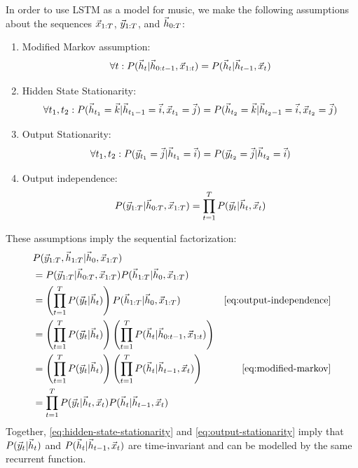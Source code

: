 In order to use LSTM as a model for music, we make the following assumptions
about the sequences $\vec{x}_{1:T}$, $\vec{y}_{1:T}$, and $\vec{h}_{0:T}$:
\begin{enumerate}
  \item Modified Markov assumption:
    \begin{equation}
      \label{eq:modified-markov}
      \forall t: P(\vec{h}_t | \vec{h}_{0:t-1}, \vec{x}_{1:t}) = P(\vec{h}_t | \vec{h}_{t-1}, \vec{x}_t)
    \end{equation}
  \item Hidden State Stationarity:
    \begin{equation}
      \label{eq:hidden-state-stationarity}
      \forall t_1, t_2: P(\vec{h}_{t_1} = \vec{k} | \vec{h}_{t_{1}-1} = \vec{i}, \vec{x}_{t_1} = \vec{j}) = P(\vec{h}_{t_2} = \vec{k} | \vec{h}_{t_{2}-1} = \vec{i}, \vec{x}_{t_2} = \vec{j})
   \end{equation}
  \item Output Stationarity:
    \begin{equation}
      \label{eq:output-stationarity}
      \forall t_1, t_2: P(\vec{y}_{t_1} = \vec{j} | \vec{h}_{t_1} = \vec{i}) = P(\vec{y}_{t_2} = \vec{j} | \vec{h}_{t_2} = \vec{i})
   \end{equation}
  \item Output independence:
   \begin{equation}
     \label{eq:output-independence}
     P(\vec{y}_{1:T} | \vec{h}_{0:T}, \vec{x}_{1:T}) = \prod_{t=1}^T P(\vec{y}_t | \vec{h}_{t}, \vec{x}_t)
   \end{equation}
\end{enumerate}

These assumptions imply the sequential factorization:
\begin{align}
  &P(\y_{1:T}, \h_{1:T} | \h_0, \x_{1:T})  &\\
  &= P(\y_{1:T} | \h_{0:T}, \x_{1:T}) P(\h_{1:T} | \h_0, \x_{1:T})  &\\
  &= \left( \prod_{t=1}^T P(\y_t | \h_t) \right) P(\h_{1:T}| \h_0, \x_{1:T}) &\text{\cref{eq:output-independence}}\\
  &= \left( \prod_{t=1}^T P(\y_t | \h_t) \right) \left(\prod_{t=1}^T P(\h_{t}| \h_{0:t-1}, \x_{1:t})\right) &\\
  &= \left( \prod_{t=1}^T P(\y_t | \h_t) \right) \left(\prod_{t=1}^T P(\h_{t}| \h_{t-1}, \x_{t})\right) &\text{\cref{eq:modified-markov}}\\
  &= \prod_{t=1}^T P(\y_t | \h_t, \x_t) P(\h_{t}| \h_{t-1}, \x_{t}) & \\
\end{align}
Together, \cref{eq:hidden-state-stationarity} and \cref{eq:output-stationarity} imply that $P(\vec{y}_t | \vec{h}_t)$
and $P(\vec{h}_{t}| \vec{h}_{t-1}, \vec{x}_{t})$ are time-invariant and can be modelled by the same recurrent function.

